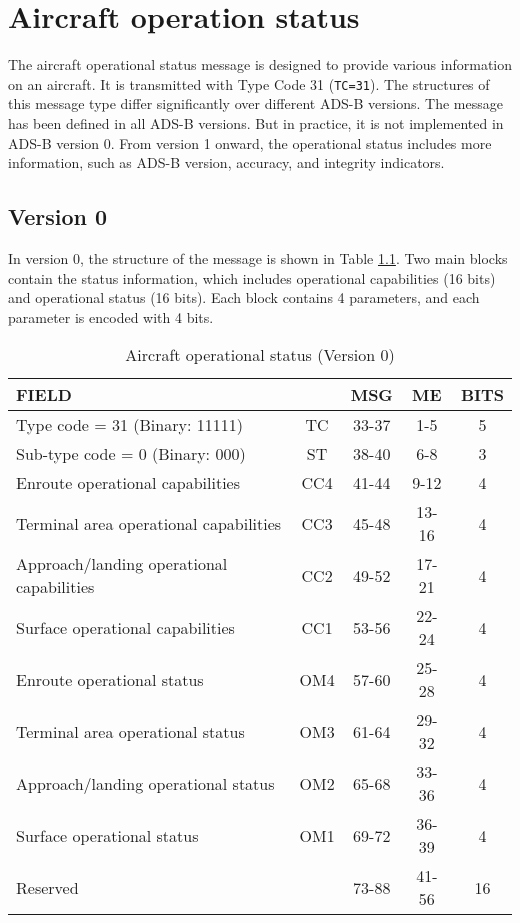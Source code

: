 \chapter{Aircraft operation status}\label{aircraft-operation-status}

The aircraft operational status message is designed to provide various information on an aircraft. It is transmitted with Type Code 31 (\texttt{TC=31}). The structures of this message type differ significantly over different ADS-B versions. The message has been defined in all ADS-B versions. But in practice, it is not implemented in ADS-B version 0. From version 1 onward, the operational status includes more information, such as ADS-B version, accuracy, and integrity indicators. 


\section{Version 0}

In version 0, the structure of the message is shown in Table \ref{tb:adsb-operational-status-v0}. Two main blocks contain the status information, which includes operational capabilities (16 bits) and operational status (16 bits). Each block contains 4 parameters, and each parameter is encoded with 4 bits.

\begin{table}[ht]
\caption{Aircraft operational status (Version 0)}
\label{tb:adsb-operational-status-v0}
\footnotesize
\begin{tabular}{|l|c|c|c|c|}
\hline
\textbf{FIELD} &  & \textbf{MSG} & \textbf{ME} & \textbf{BITS} \\ \hline
Type code = 31 (Binary: 11111) & TC & 33-37 & 1-5 & 5 \\ \hline
Sub-type code = 0 (Binary: 000) & ST & 38-40 & 6-8 & 3 \\ \hline
Enroute operational capabilities & CC4 & 41-44 & 9-12 & 4\\
Terminal area operational capabilities & CC3 & 45-48 & 13-16 & 4\\
Approach/landing operational capabilities & CC2 & 49-52 & 17-21 & 4\\
Surface operational capabilities & CC1 & 53-56 & 22-24 & 4 \\ \hline
Enroute operational status & OM4 & 57-60 & 25-28 & 4\\
Terminal area operational status & OM3 & 61-64 & 29-32 & 4\\
Approach/landing operational status & OM2 & 65-68 & 33-36 & 4 \\
Surface operational status  & OM1 & 69-72 & 36-39 & 4\\ \hline
Reserved & & 73-88 & 41-56 & 16 \\ \hline
\end{tabular}
\end{table}

